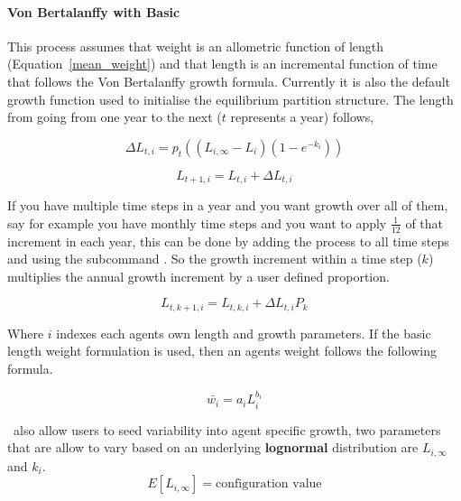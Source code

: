 \paragraph{Von Bertalanffy with Basic}\label{subsubsec:vonbert_basic}
This process assumes that weight is an allometric function of length (Equation~\ref{mean_weight}) and that length is an incremental function of time that follows the Von Bertalanffy growth formula. Currently it is also the default growth function used to initialise the equilibrium partition structure. The length from going from one year to the next ($t$ represents a year) follows,

\begin{equation}\label{VB}
\Delta L_{t,i} = p_t((L_{i,\infty} - L_i)(1 - e^{-k_i}))
\end{equation}

\begin{equation}\label{actual_growth}
L_{t+1,i} = L_{t,i} + \Delta L_{t,i}
\end{equation}

If you have multiple time steps in a year and you want growth over all of them, say for example you have monthly time steps and you want to apply $\frac{1}{12}$ of that increment in each year, this can be done by adding the process to all time steps and using the subcommand . So the growth increment within a time step ($k$) multiplies the annual growth increment by a user defined proportion.

\begin{equation}\label{actual_growth_in_time_step}
L_{t,k + 1,i} = L_{t,k,i} + \Delta L_{t,i}P_k
\end{equation}


Where $i$ indexes each agents own length and growth parameters. If the basic length weight formulation is used, then an agents weight follows the following formula.

\begin{equation}\label{mean_weight}
\bar{w_i} = a_iL_i^{b_i}
\end{equation}

\IBM\ also allow users to seed variability into agent specific growth, two parameters that are allow to vary based on an underlying \textbf{lognormal} distribution are $L_{i,\infty}$ and $k_i$.\\

$$E[L_{i,\infty}] = \text{configuration value}$$


